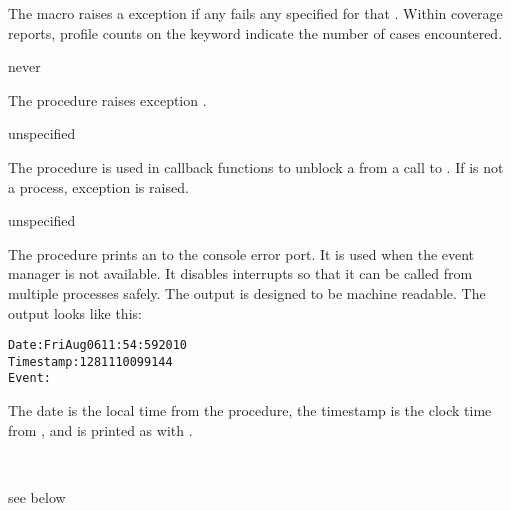 The  macro raises a  exception if
any  fails any  specified for that .
Within coverage reports, profile counts on the 
keyword indicate the number of  cases encountered.

\begin{procedure}
\end{procedure}
\returns{} never

The  procedure raises exception .

\begin{procedure}
\end{procedure}
\returns{} unspecified

The  procedure is used in callback functions to
unblock a  from a call to . If
 is not a process, exception  is raised.

\begin{procedure}
\end{procedure}
\returns{} unspecified

The  procedure prints an  to
the console error port. It is used when the event manager is not
available. It disables interrupts so that it can be called from
multiple processes safely.  The output is designed to be machine
readable. The output looks like this:

\begin{alltt}
Date: Fri Aug 06 11:54:59 2010
Timestamp: 1281110099144
Event: 
\end{alltt}

The date is the local time from the  procedure,
the timestamp is the clock time from , and
 is printed as with .

\begin{procedure}
  \\
\end{procedure}
\returns{} see below


